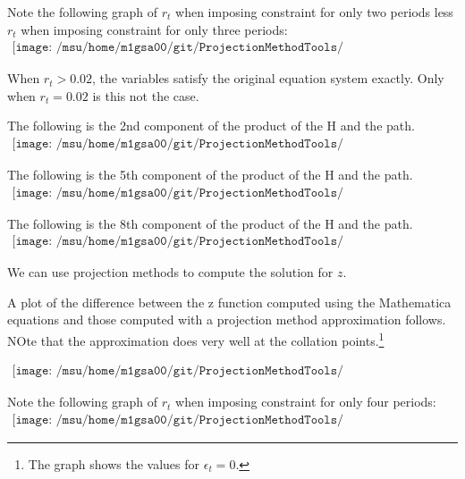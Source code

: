 \documentclass[12pt]{article}
\begin{document}
Note the following graph of $r_t$ when imposing constraint for only two periods
less $r_t$ when imposing constraint for only three periods:
\begin{gather*}
\texttt{[image: /msu/home/m1gsa00/git/ProjectionMethodTools/ProjectionMethodToolsJava/code/prettyrr02lessrr03.pdf]}
\end{gather*}


When $r_t>0.02$, the variables satisfy the original equation system exactly.
Only when $r_t=0.02$ is this not the case.


The following is the 2nd component of the product of the H and the path.
\begin{gather*}
\texttt{[image: /msu/home/m1gsa00/git/ProjectionMethodTools/ProjectionMethodToolsJava/code/prettyhapp03A.pdf]}
\end{gather*}

The following is the 5th component of the product of the H and the path.
\begin{gather*}
\texttt{[image: /msu/home/m1gsa00/git/ProjectionMethodTools/ProjectionMethodToolsJava/code/prettyhapp03B.pdf]}
\end{gather*}

The following is the 8th component of the product of the H and the path.
\begin{gather*}
\texttt{[image: /msu/home/m1gsa00/git/ProjectionMethodTools/ProjectionMethodToolsJava/code/prettyhapp03C.pdf]}
\end{gather*}



We can use projection methods to compute the solution for $z$.

A plot of the difference between the z function computed using the Mathematica equations and those computed with a projection method approximation follows. NOte that the approximation does very well at the collation points.\footnote{The graph shows the values for $\epsilon_t=0$.}


\begin{gather*}
\texttt{[image: /msu/home/m1gsa00/git/ProjectionMethodTools/ProjectionMethodToolsJava/code/prettyNumDiff03.pdf]}
\end{gather*}




Note the following graph of $r_t$ when imposing constraint for only four
 periods:
\begin{gather*}
\texttt{[image: /msu/home/m1gsa00/git/ProjectionMethodTools/ProjectionMethodToolsJava/code/prettyrr04.pdf]}
\end{gather*}
\end{document}
